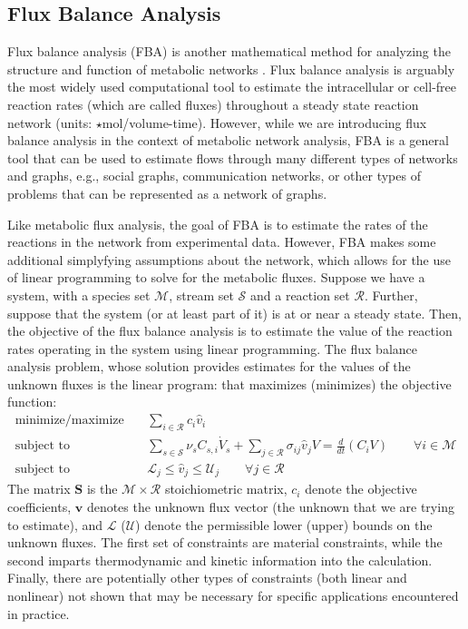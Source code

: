 \documentclass{article}[12pt]
\begin{document}
\subsection{Flux Balance Analysis}
Flux balance analysis (FBA) is another mathematical method for analyzing the structure and function of metabolic networks \cite{Orth:2010aa}.
Flux balance analysis is arguably the most widely used computational tool to estimate the intracellular or cell-free reaction rates (which are called fluxes) 
throughout a steady state reaction network (units: $\star$mol/volume-time). 
However, while we are introducing flux balance analysis in the context of metabolic network analysis, FBA is a general tool that can be used to 
estimate flows through many different types of networks and graphs, e.g., social graphs, communication networks, or other types of problems that can be represented as a network of graphs.  

Like metabolic flux analysis, the goal of FBA is to estimate the rates of the reactions in the network from experimental data.
However, FBA makes some additional simplyfying assumptions about the network, which allows for the use of linear programming to solve for the metabolic fluxes.
Suppose we have a system, with a species set $\mathcal{M}$, stream set $\mathcal{S}$ and a reaction set $\mathcal{R}$. 
Further, suppose that the system (or at least part of it) is at or near a steady state. 
Then, the objective of the flux balance analysis is to estimate the value of the reaction rates operating in the system using linear programming.
The flux balance analysis problem, whose solution provides estimates for the values of the unknown fluxes is the linear program: 
that maximizes (minimizes) the objective function:
\begin{eqnarray}
\text{minimize/maximize}~& & \sum_{i\in\mathcal{R}}c_{i}\hat{v}_{i}\\
\text{subject to} & & \sum_{s\in\mathcal{S}}\nu_{s}C_{s,i}\dot{V}_{s} + \sum_{j\in\mathcal{R}}\sigma_{ij}\hat{v}_{j}V = \frac{d}{dt}\left(C_{i}V\right)\qquad\forall{i\in\mathcal{M}}\\
\text{subject to} & & \mathcal{L}_{j}\leq\hat{v}_{j}\leq\mathcal{U}_{j}\qquad\forall{j\in\mathcal{R}}
\end{eqnarray}
The matrix $\mathbf{S}$ is the $\mathcal{M}\times\mathcal{R}$ stoichiometric matrix, $c_{i}$ denote the objective coefficients, 
$\mathbf{v}$ denotes the unknown flux vector (the unknown that we are trying to estimate), and 
$\mathcal{L}$ ($\mathcal{U}$) denote the permissible lower (upper) bounds on the unknown fluxes. 
The first set of constraints are material constraints, 
while the second imparts thermodynamic and kinetic information into the calculation. 
Finally, there are potentially other types of constraints (both linear and nonlinear) not shown 
that may be necessary for specific applications encountered in practice.
\end{document}
